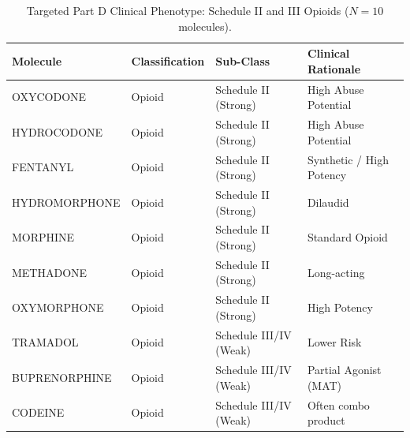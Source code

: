 \begin{table}[htbp]
\caption{Targeted Part D Clinical Phenotype: Schedule II and III Opioids ($N=10$ molecules).}
\label{tab:opioids}
\begin{tabular}{llp{3cm}p{4cm}}
\toprule
\rowcolor{gray!10}
Molecule & Classification & Sub-Class & Clinical Rationale \\
\midrule
OXYCODONE & Opioid & Schedule II (Strong) & High Abuse Potential \\
HYDROCODONE & Opioid & Schedule II (Strong) & High Abuse Potential \\
FENTANYL & Opioid & Schedule II (Strong) & Synthetic / High Potency \\
HYDROMORPHONE & Opioid & Schedule II (Strong) & Dilaudid \\
MORPHINE & Opioid & Schedule II (Strong) & Standard Opioid \\
METHADONE & Opioid & Schedule II (Strong) & Long-acting \\
OXYMORPHONE & Opioid & Schedule II (Strong) & High Potency \\
TRAMADOL & Opioid & Schedule III/IV (Weak) & Lower Risk \\
BUPRENORPHINE & Opioid & Schedule III/IV (Weak) & Partial Agonist (MAT) \\
CODEINE & Opioid & Schedule III/IV (Weak) & Often combo product \\
\bottomrule
\end{tabular}
\end{table}
